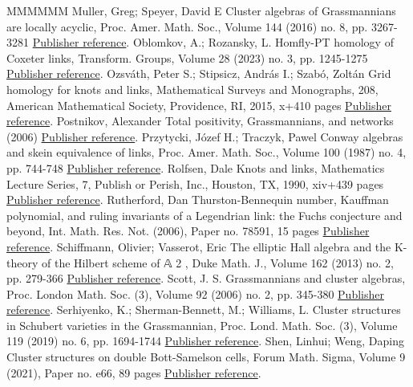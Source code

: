 \documentclass[11pt]{article}
\theoremstyle{definition}
\numberwithin{equation}{section}
\begin{document}
\begin{thebibliography}{MMMMMM}
 Muller, Greg; Speyer, David E Cluster algebras of Grassmannians are locally acyclic, Proc. Amer. Math. Soc., Volume 144 (2016) no. 8, pp. 3267-3281 \href{https://alco.centre-mersenne.org/articles/10.5802/alco.345/#MSLA}{Publisher reference}.
 Oblomkov, A.; Rozansky, L. Homfly-PT homology of Coxeter links, Transform. Groups, Volume 28 (2023) no. 3, pp. 1245-1275 \href{https://alco.centre-mersenne.org/articles/10.5802/alco.345/#ObRo}{Publisher reference}.
 Ozsváth, Peter S.; Stipsicz, András I.; Szabó, Zoltán Grid homology for knots and links, Mathematical Surveys and Monographs, 208, American Mathematical Society, Providence, RI, 2015, x+410 pages \href{https://alco.centre-mersenne.org/articles/10.5802/alco.345/#OSS}{Publisher reference}.
 Postnikov, Alexander Total positivity, Grassmannians, and networks (2006) \href{https://alco.centre-mersenne.org/articles/10.5802/alco.345/#Pos}{Publisher reference}.
 Przytycki, Józef H.; Traczyk, Pawel Conway algebras and skein equivalence of links, Proc. Amer. Math. Soc., Volume 100 (1987) no. 4, pp. 744-748 \href{https://alco.centre-mersenne.org/articles/10.5802/alco.345/#PT}{Publisher reference}.
 Rolfsen, Dale Knots and links, Mathematics Lecture Series, 7, Publish or Perish, Inc., Houston, TX, 1990, xiv+439 pages \href{https://alco.centre-mersenne.org/articles/10.5802/alco.345/#Rolfsen}{Publisher reference}.
 Rutherford, Dan Thurston-Bennequin number, Kauffman polynomial, and ruling invariants of a Legendrian link: the Fuchs conjecture and beyond, Int. Math. Res. Not. (2006), Paper no. 78591, 15 pages \href{https://alco.centre-mersenne.org/articles/10.5802/alco.345/#Ruth}{Publisher reference}.
 Schiffmann, Olivier; Vasserot, Eric The elliptic Hall algebra and the K-theory of the Hilbert scheme of 𝔸 2 , Duke Math. J., Volume 162 (2013) no. 2, pp. 279-366 \href{https://alco.centre-mersenne.org/articles/10.5802/alco.345/#ScVa}{Publisher reference}.
 Scott, J. S. Grassmannians and cluster algebras, Proc. London Math. Soc. (3), Volume 92 (2006) no. 2, pp. 345-380 \href{https://alco.centre-mersenne.org/articles/10.5802/alco.345/#Scott}{Publisher reference}.
 Serhiyenko, K.; Sherman-Bennett, M.; Williams, L. Cluster structures in Schubert varieties in the Grassmannian, Proc. Lond. Math. Soc. (3), Volume 119 (2019) no. 6, pp. 1694-1744 \href{https://alco.centre-mersenne.org/articles/10.5802/alco.345/#SSBW}{Publisher reference}.
 Shen, Linhui; Weng, Daping Cluster structures on double Bott-Samelson cells, Forum Math. Sigma, Volume 9 (2021), Paper no. e66, 89 pages \href{https://alco.centre-mersenne.org/articles/10.5802/alco.345/#SW}{Publisher reference}.

\end{thebibliography}
\end{document}
